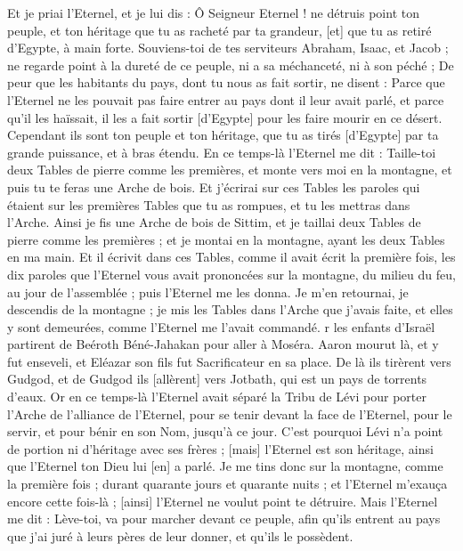 \begin{multicols}{2}
Et je priai l'Eternel, et je lui dis : Ô Seigneur Eternel ! ne détruis point ton peuple, et ton héritage que tu as racheté par ta grandeur, [et] que tu as retiré d'Egypte, à main forte.
Souviens-toi de tes serviteurs Abraham, Isaac, et Jacob ; ne regarde point à la dureté de ce peuple, ni a sa méchanceté, ni à son péché ;
De peur que les habitants du pays, dont tu nous as fait sortir, ne disent : Parce que l'Eternel ne les pouvait pas faire entrer au pays dont il leur avait parlé, et parce qu'il les haïssait, il les a fait sortir [d'Egypte] pour les faire mourir en ce désert.
Cependant ils sont ton peuple et ton héritage, que tu as tirés [d'Egypte] par ta grande puissance, et à bras étendu.
\VerseOne{}En ce temps-là l'Eternel me dit : Taille-toi deux Tables de pierre comme les premières, et monte vers moi en la montagne, et puis tu te feras une Arche de bois.
Et j'écrirai sur ces Tables les paroles qui étaient sur les premières Tables que tu as rompues, et tu les mettras dans l'Arche.
Ainsi je fis une Arche de bois de Sittim, et je taillai deux Tables de pierre comme les premières ; et je montai en la montagne, ayant les deux Tables en ma main.
Et il écrivit dans ces Tables, comme il avait écrit la première fois, les dix paroles que l'Eternel vous avait prononcées sur la montagne, du milieu du feu, au jour de l'assemblée ; puis l'Eternel me les donna.
Je m'en retournai, je descendis de la montagne ; je mis les Tables dans l'Arche que j'avais faite, et elles y sont demeurées, comme l'Eternel me l'avait commandé.
r les enfants d'Israël partirent de Beéroth Béné-Jahakan pour aller à Moséra. Aaron mourut là, et y fut enseveli, et Eléazar son fils fut Sacrificateur en sa place.
De là ils tirèrent vers Gudgod, et de Gudgod ils [allèrent] vers Jotbath, qui est un pays de torrents d'eaux.
Or en ce temps-là l'Eternel avait séparé la Tribu de Lévi pour porter l'Arche de l'alliance de l'Eternel, pour se tenir devant la face de l'Eternel, pour le servir, et pour bénir en son Nom, jusqu'à ce jour.
C'est pourquoi Lévi n'a point de portion ni d'héritage avec ses frères ; [mais] l'Eternel est son héritage, ainsi que l'Eternel ton Dieu lui [en] a parlé.
Je me tins donc sur la montagne, comme la première fois ; durant quarante jours et quarante nuits ; et l'Eternel m'exauça encore cette fois-là ; [ainsi] l'Eternel ne voulut point te détruire.
Mais l'Eternel me dit : Lève-toi, va pour marcher devant ce peuple, afin qu'ils entrent au pays que j'ai juré à leurs pères de leur donner, et qu'ils le possèdent.

\end{multicols}
